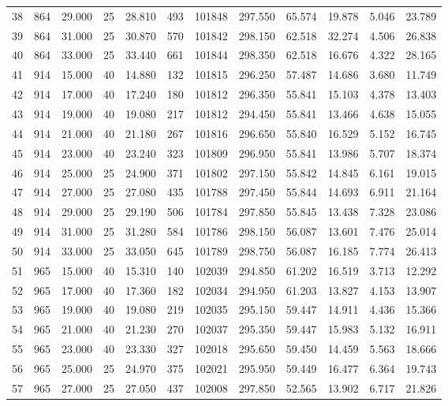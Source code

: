 \begin{table}[H]
\begin{center}
\begin{tabular}{|cccccccccccc|}
	38 & 864 & 29.000 & 25 & 28.810 & 493 & 101848 & 297.550 & 65.574 & 19.878 & 5.046 & 23.789\\
	39 & 864 & 31.000 & 25 & 30.870 & 570 & 101842 & 298.150 & 62.518 & 32.274 & 4.506 & 26.838\\
	40 & 864 & 33.000 & 25 & 33.440 & 661 & 101844 & 298.350 & 62.518 & 16.676 & 4.322 & 28.165\\
	41 & 914 & 15.000 & 40 & 14.880 & 132 & 101815 & 296.250 & 57.487 & 14.686 & 3.680 & 11.749\\
	42 & 914 & 17.000 & 40 & 17.240 & 180 & 101812 & 296.350 & 55.841 & 15.103 & 4.378 & 13.403\\
	43 & 914 & 19.000 & 40 & 19.080 & 217 & 101812 & 294.450 & 55.841 & 13.466 & 4.638 & 15.055\\
	44 & 914 & 21.000 & 40 & 21.180 & 267 & 101816 & 296.650 & 55.840 & 16.529 & 5.152 & 16.745\\
	45 & 914 & 23.000 & 40 & 23.240 & 323 & 101809 & 296.950 & 55.841 & 13.986 & 5.707 & 18.374\\
	46 & 914 & 25.000 & 25 & 24.900 & 371 & 101802 & 297.150 & 55.842 & 14.845 & 6.161 & 19.015\\
	47 & 914 & 27.000 & 25 & 27.080 & 435 & 101788 & 297.450 & 55.844 & 14.693 & 6.911 & 21.164\\
	48 & 914 & 29.000 & 25 & 29.190 & 506 & 101784 & 297.850 & 55.845 & 13.438 & 7.328 & 23.086\\
	49 & 914 & 31.000 & 25 & 31.280 & 584 & 101786 & 298.150 & 56.087 & 13.601 & 7.476 & 25.014\\
	50 & 914 & 33.000 & 25 & 33.050 & 645 & 101789 & 298.750 & 56.087 & 16.185 & 7.774 & 26.413\\
	51 & 965 & 15.000 & 40 & 15.310 & 140 & 102039 & 294.850 & 61.202 & 16.519 & 3.713 & 12.292\\
	52 & 965 & 17.000 & 40 & 17.360 & 182 & 102034 & 294.950 & 61.203 & 13.827 & 4.153 & 13.907\\
	53 & 965 & 19.000 & 40 & 19.080 & 219 & 102035 & 295.150 & 59.447 & 14.911 & 4.436 & 15.366\\
	54 & 965 & 21.000 & 40 & 21.230 & 270 & 102037 & 295.350 & 59.447 & 15.983 & 5.132 & 16.911\\
	55 & 965 & 23.000 & 40 & 23.330 & 327 & 102018 & 295.650 & 59.450 & 14.459 & 5.563 & 18.666\\
	56 & 965 & 25.000 & 25 & 24.970 & 375 & 102021 & 295.950 & 59.449 & 16.477 & 6.364 & 19.743\\
	57 & 965 & 27.000 & 25 & 27.050 & 437 & 102008 & 297.850 & 52.565 & 13.902 & 6.717 & 21.826\\

\end{tabular}
\end{center}
\end{table}
